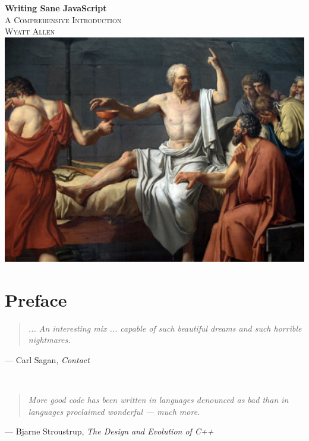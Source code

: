 \documentclass[11pt,letter]{book}
\begin{document}
    \frontmatter

    \begin{titlepage}
        \begin{center}
            { \huge \bfseries Writing Sane JavaScript}\\[0.4cm]
            \textsc{\Large A Comprehensive Introduction}\\[0.5cm]
            \textsc{Wyatt Allen}
            \HRule \\[1.2cm]
            \includegraphics[width=14cm]{socrates-hemlock}
            \vfill
        \end{center}
    \end{titlepage}
    
    \tableofcontents 
    
    \chapter{Preface}
    \begin{quote}
        \emph{
            ... An interesting mix ... capable of such beautiful dreams and such horrible 
            nightmares.
        }
    \end{quote}
    \begin{flushright}
        --- Carl Sagan, \emph{Contact}
    \end{flushright}
    \HRule \\[1.2cm]
	
	\begin{quote}
        \emph{
            More good code has been written in languages denounced as bad than in languages 
			proclaimed wonderful --- much more.
        }
    \end{quote}
    \begin{flushright}
        --- Bjarne Stroustrup, \emph{The Design and Evolution of C++}
    \end{flushright}
    \HRule \\[1.2cm]
    
\end{document}
